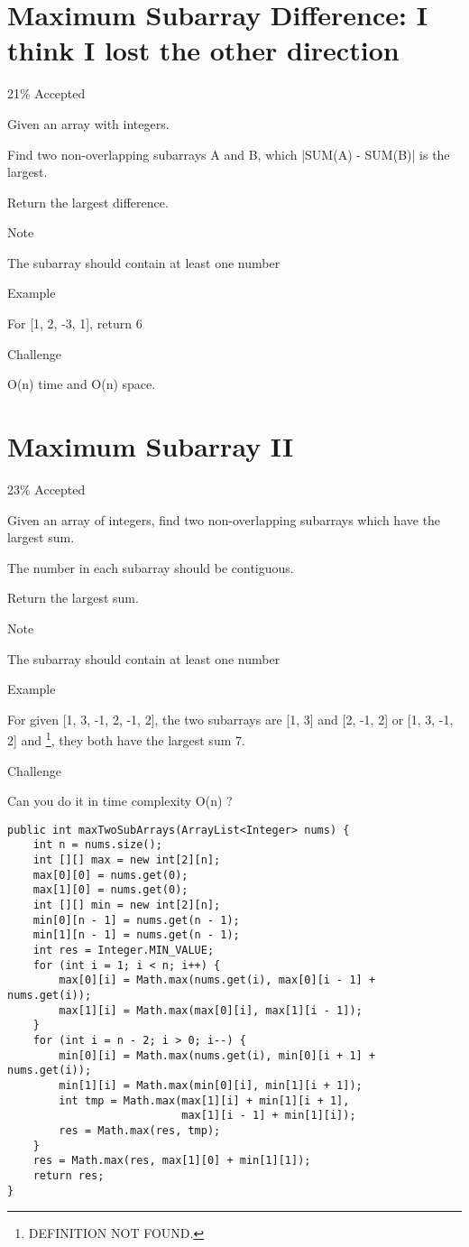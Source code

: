 \documentclass[9pt, b5paaper]{book}
\begin{document}
\section{Maximum Subarray Difference: I think I lost the other direction}
\label{sec-1-40}

21\% Accepted

Given an array with integers.

Find two non-overlapping subarrays A and B, which |SUM(A) - SUM(B)| is the largest.

Return the largest difference.

Note

The subarray should contain at least one number

Example

For [1, 2, -3, 1], return 6

Challenge

O(n) time and O(n) space.
\section{Maximum Subarray II}
\label{sec-1-41}

23\% Accepted

Given an array of integers, find two non-overlapping subarrays which have the largest sum.

The number in each subarray should be contiguous.

Return the largest sum.

Note

The subarray should contain at least one number

Example

For given [1, 3, -1, 2, -1, 2], the two subarrays are [1, 3] and [2, -1, 2] or [1, 3, -1, 2] and \footnote{DEFINITION NOT FOUND.}, they both have the largest sum 7.

Challenge

Can you do it in time complexity O(n) ?
\begin{verbatim}
public int maxTwoSubArrays(ArrayList<Integer> nums) {
    int n = nums.size();
    int [][] max = new int[2][n];
    max[0][0] = nums.get(0);
    max[1][0] = nums.get(0);
    int [][] min = new int[2][n];
    min[0][n - 1] = nums.get(n - 1); 
    min[1][n - 1] = nums.get(n - 1);
    int res = Integer.MIN_VALUE;
    for (int i = 1; i < n; i++) {
        max[0][i] = Math.max(nums.get(i), max[0][i - 1] + nums.get(i));
        max[1][i] = Math.max(max[0][i], max[1][i - 1]);
    }
    for (int i = n - 2; i > 0; i--) {
        min[0][i] = Math.max(nums.get(i), min[0][i + 1] + nums.get(i));
        min[1][i] = Math.max(min[0][i], min[1][i + 1]);
        int tmp = Math.max(max[1][i] + min[1][i + 1],
                           max[1][i - 1] + min[1][i]);
        res = Math.max(res, tmp);
    }
    res = Math.max(res, max[1][0] + min[1][1]);
    return res;
}
\end{verbatim}
\end{document}
